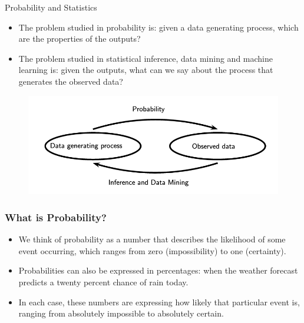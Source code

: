 \documentclass[handout]{beamer}
\begin{document}
\begin{frame}{Probability and Statistics}

\scriptsize{
\begin{itemize}
  \item The problem studied in probability is: given a data generating process, which are the properties of the outputs?
 \item The problem studied in statistical inference, data mining and machine learning is: given the outputs, what can we say about the process that generates the observed data? 
\end{itemize}

}
\begin{figure}[h!]
	\centering
	\includegraphics[scale=0.3]{pics/probandstats.png}
\end{figure}


\end{frame}

\begin{frame}\frametitle{What is Probability?}
\scriptsize{

\begin{itemize}
 \item We think of probability as a number that describes the likelihood of some event occurring, which ranges from zero (impossibility) to one (certainty).
 \item Probabilities can also be expressed in percentages: when the weather forecast predicts a twenty percent chance of rain today. 
 \item In each case, these numbers are expressing how likely that particular event is, ranging from absolutely impossible to absolutely certain.
\end{itemize}

}

\end{frame}
\end{document}

